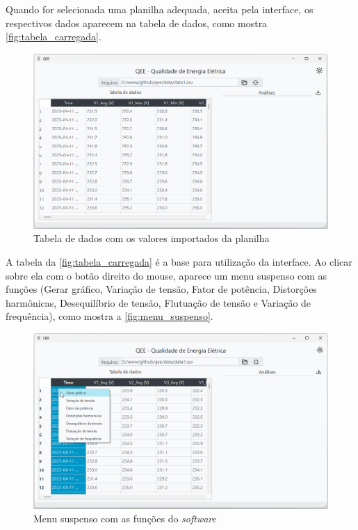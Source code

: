 Quando for selecionada uma planilha adequada, aceita pela interface, os respectivos dados aparecem na tabela de dados, como mostra \autoref{fig:tabela_carregada}.

\begin{figure}[H]
  \centering
  \caption{Tabela de dados com os valores importados da planilha}
  \label{fig:tabela_carregada}
  \includegraphics[width=15cm]{illustrations/figures/tabela_carregada.png}
\end{figure}

A tabela da \autoref{fig:tabela_carregada} é a base para utilização da interface. Ao clicar sobre ela com o botão direito do mouse, aparece um menu suspenso com as funções (Gerar gráfico, Variação de tensão, Fator de potência, Distorções harmônicas, Desequilíbrio de tensão, Flutuação de tensão e Variação de frequência), como mostra a \autoref{fig:menu_suspenso}.

\begin{figure}[H]
  \centering
  \caption{Menu suspenso com as funções do \textit{software}}
  \label{fig:menu_suspenso}
  \includegraphics[width=15cm]{illustrations/figures/menu_suspenso.png}
\end{figure}

